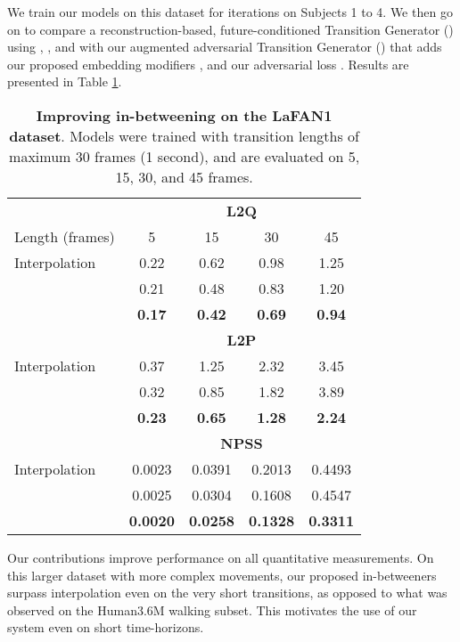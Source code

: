 \documentclass[acmtog]{acmart}
\begin{document}
We train our models on this dataset for  iterations on Subjects 1 to 4. We then go on to compare a reconstruction-based, future-conditioned Transition Generator () using , ,  and  with our augmented adversarial Transition Generator () that adds our proposed embedding modifiers ,  and our adversarial loss . Results are presented in Table \ref{table:lafanres}.
\begin{table}[h]
    \centering
    \caption{\textbf{Improving in-betweening on the LaFAN1 dataset}. Models were trained with transition lengths of maximum 30 frames (1 second), and are evaluated on 5, 15, 30, and 45 frames.}
    \small
\begin{tabular}{lccc|c}
        
        &\multicolumn{4}{c}{\textbf{L2Q}}\\
        \cmidrule(r){2-5}
        Length (frames) &5&15&30&45 \\
        \midrule 
        Interpolation           & 0.22 &0.62  &0.98 &1.25\\
 & 0.21 &0.48  &0.83 &1.20\\
          & \textbf{0.17}	&\textbf{0.42} &\textbf{0.69}	&\textbf{0.94}\\
        &\multicolumn{4}{c}{\textbf{L2P}}\\
        \cmidrule(r){2-5}
        Interpolation           &0.37 &1.25 &2.32 &3.45\\
 & 0.32 &0.85  &1.82 &3.89\\
           &\textbf{0.23} &\textbf{0.65} &\textbf{1.28} &\textbf{2.24}\\
        &\multicolumn{4}{c}{\textbf{NPSS}}\\
        \cmidrule(r){2-5}
        Interpolation               &0.0023 &0.0391 &0.2013 &0.4493\\
     & 0.0025 &0.0304  &0.1608 &0.4547\\
           &\textbf{0.0020}	&\textbf{0.0258} &\textbf{0.1328} &\textbf{0.3311}\\
\end{tabular}
    \label{table:lafanres}
\end{table} 
Our contributions improve performance on all quantitative measurements. On this larger dataset with more complex movements, our proposed in-betweeners surpass interpolation even on the very short transitions, as opposed to what was observed on the Human3.6M walking subset. This motivates the use of our system even on short time-horizons. 
\end{document}
